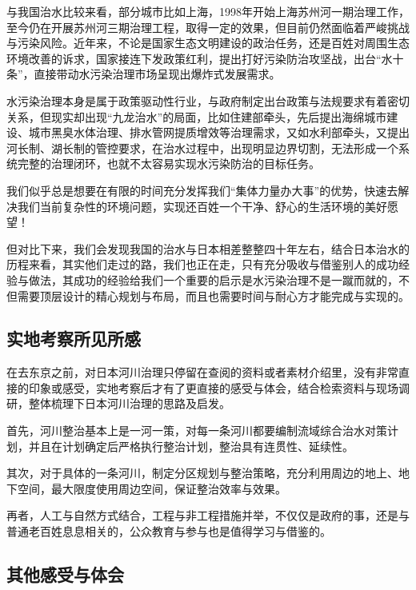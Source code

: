 \documentclass[]{book}
\begin{document}
与我国治水比较来看，部分城市比如上海，1998年开始上海苏州河一期治理工作，至今仍在开展苏州河三期治理工程，取得一定的效果，但目前仍然面临着严峻挑战与污染风险。近年来，不论是国家生态文明建设的政治任务，还是百姓对周围生态环境改善的诉求，国家接连下发政策红利，提出打好污染防治攻坚战，出台``水十条''，直接带动水污染治理市场呈现出爆炸式发展需求。

水污染治理本身是属于政策驱动性行业，与政府制定出台政策与法规要求有着密切关系，但现实却出现``九龙治水''的局面，比如住建部牵头，先后提出海绵城市建设、城市黑臭水体治理、排水管网提质增效等治理需求，又如水利部牵头，又提出河长制、湖长制的管控要求，在治水过程中，出现明显边界切割，无法形成一个系统完整的治理闭环，也就不太容易实现水污染防治的目标任务。

我们似乎总是想要在有限的时间充分发挥我们``集体力量办大事''的优势，快速去解决我们当前复杂性的环境问题，实现还百姓一个干净、舒心的生活环境的美好愿望！

但对比下来，我们会发现我国的治水与日本相差整整四十年左右，结合日本治水的历程来看，其实他们走过的路，我们也正在走，只有充分吸收与借鉴别人的成功经验与做法，其成功的经验给我们一个重要的启示是水污染治理不是一蹴而就的，不但需要顶层设计的精心规划与布局，而且也需要时间与耐心方才能完成与实现的。

\hypertarget{ux5b9eux5730ux8003ux5bdfux6240ux89c1ux6240ux611f}{%
\subsection{实地考察所见所感}\label{ux5b9eux5730ux8003ux5bdfux6240ux89c1ux6240ux611f}}

在去东京之前，对日本河川治理只停留在查阅的资料或者素材介绍里，没有非常直接的印象或感受，实地考察后才有了更直接的感受与体会，结合检索资料与现场调研，整体梳理下日本河川治理的思路及启发。

首先，河川整治基本上是一河一策，对每一条河川都要编制流域综合治水对策计划，并且在计划确定后严格执行整治计划，整治具有连贯性、延续性。

其次，对于具体的一条河川，制定分区规划与整治策略，充分利用周边的地上、地下空间，最大限度使用周边空间，保证整治效率与效果。

再者，人工与自然方式结合，工程与非工程措施并举，不仅仅是政府的事，还是与普通老百姓息息相关的，公众教育与参与也是值得学习与借鉴的。

\hypertarget{ux5176ux4ed6ux611fux53d7ux4e0eux4f53ux4f1a}{%
\subsection{其他感受与体会}\label{ux5176ux4ed6ux611fux53d7ux4e0eux4f53ux4f1a}}
\end{document}
